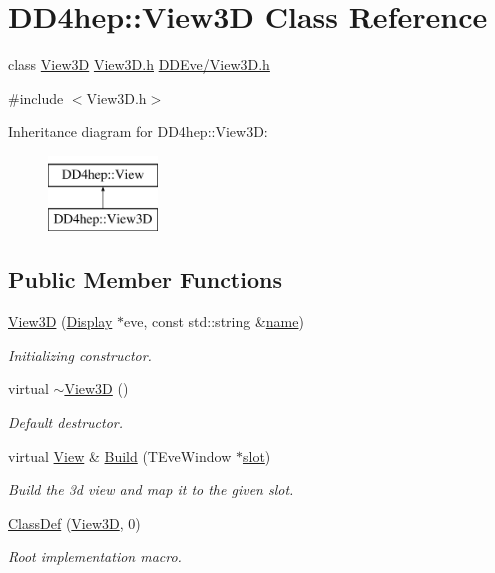 \hypertarget{class_d_d4hep_1_1_view3_d}{}\section{D\+D4hep\+:\+:View3D Class Reference}
\label{class_d_d4hep_1_1_view3_d}


class \hyperlink{class_d_d4hep_1_1_view3_d}{View3D} \hyperlink{_view3_d_8h}{View3\+D.\+h} \hyperlink{_view3_d_8h}{D\+D\+Eve/\+View3\+D.\+h}  




{\ttfamily \#include $<$View3\+D.\+h$>$}

Inheritance diagram for D\+D4hep\+:\+:View3D\+:\begin{figure}[H]
\begin{center}
\leavevmode
\includegraphics[height=2.000000cm]{class_d_d4hep_1_1_view3_d}
\end{center}
\end{figure}
\subsection*{Public Member Functions}
\begin{DoxyCompactItemize}
\item 
\hyperlink{class_d_d4hep_1_1_view3_d_aec5a272c7c13401f3c40cf51170b9ace}{View3D} (\hyperlink{class_d_d4hep_1_1_display}{Display} $\ast$eve, const std\+::string \&\hyperlink{class_d_d4hep_1_1_view_ae369eadf16399a6bf34f1ce491b7a788}{name})
\begin{DoxyCompactList}\small\item\em Initializing constructor. \end{DoxyCompactList}\item 
virtual \hyperlink{class_d_d4hep_1_1_view3_d_a54e79a96844ebb7e5337622cf65188aa}{$\sim$\+View3D} ()
\begin{DoxyCompactList}\small\item\em Default destructor. \end{DoxyCompactList}\item 
virtual \hyperlink{class_d_d4hep_1_1_view}{View} \& \hyperlink{class_d_d4hep_1_1_view3_d_a8067ea1bbbbcf503e271acd7dcace79f}{Build} (T\+Eve\+Window $\ast$\hyperlink{_multi_view_8cpp_a402e7b855ac7bcf09e2ecf5e98220a11}{slot})
\begin{DoxyCompactList}\small\item\em Build the 3d view and map it to the given slot. \end{DoxyCompactList}\item 
\hyperlink{class_d_d4hep_1_1_view3_d_af7a20e27b1a1a86cd76af61d17167172}{Class\+Def} (\hyperlink{class_d_d4hep_1_1_view3_d}{View3D}, 0)
\begin{DoxyCompactList}\small\item\em Root implementation macro. \end{DoxyCompactList}\end{DoxyCompactItemize}
